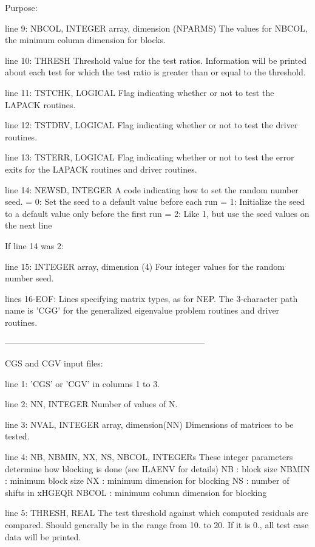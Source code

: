 \begin{DoxyParagraph}{Purpose\+: }
\begin{DoxyVerb}
 line 9:  NBCOL, INTEGER array, dimension (NPARMS)
          The values for NBCOL, the minimum column dimension for
          blocks.

 line 10: THRESH
          Threshold value for the test ratios.  Information will be
          printed about each test for which the test ratio is greater
          than or equal to the threshold.

 line 11: TSTCHK, LOGICAL
          Flag indicating whether or not to test the LAPACK routines.

 line 12: TSTDRV, LOGICAL
          Flag indicating whether or not to test the driver routines.

 line 13: TSTERR, LOGICAL
          Flag indicating whether or not to test the error exits for
          the LAPACK routines and driver routines.

 line 14: NEWSD, INTEGER
          A code indicating how to set the random number seed.
          = 0:  Set the seed to a default value before each run
          = 1:  Initialize the seed to a default value only before the
                first run
          = 2:  Like 1, but use the seed values on the next line

 If line 14 was 2:

 line 15: INTEGER array, dimension (4)
          Four integer values for the random number seed.

 lines 16-EOF:  Lines specifying matrix types, as for NEP.
          The 3-character path name is 'CGG' for the generalized
          eigenvalue problem routines and driver routines.

-----------------------------------------------------------------------

 CGS and CGV input files:

 line 1:  'CGS' or 'CGV' in columns 1 to 3.

 line 2:  NN, INTEGER
          Number of values of N.

 line 3:  NVAL, INTEGER array, dimension(NN)
          Dimensions of matrices to be tested.

 line 4:  NB, NBMIN, NX, NS, NBCOL, INTEGERs
          These integer parameters determine how blocking is done
          (see ILAENV for details)
          NB     : block size
          NBMIN  : minimum block size
          NX     : minimum dimension for blocking
          NS     : number of shifts in xHGEQR
          NBCOL  : minimum column dimension for blocking

 line 5:  THRESH, REAL
          The test threshold against which computed residuals are
          compared. Should generally be in the range from 10. to 20.
          If it is 0., all test case data will be printed.


\end{DoxyVerb}
\end{DoxyParagraph}
